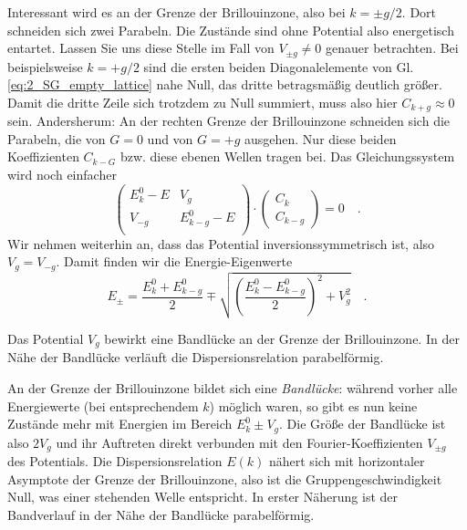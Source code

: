 Interessant wird es an der Grenze der Brillouinzone, also bei $k = \pm g/2$. Dort schneiden sich zwei Parabeln. Die Zustände sind ohne Potential also energetisch entartet. Lassen Sie uns diese Stelle im Fall von  $V_{\pm g} \neq 0$ genauer betrachten. Bei beispielsweise $k = + g/2$  sind die ersten beiden Diagonalelemente von Gl. \ref{eq:2_SG_empty_lattice} nahe Null, das dritte betragsmäßig deutlich größer. Damit die dritte Zeile sich trotzdem zu Null summiert, muss also hier $C_{k+g} \approx 0$ sein. Andersherum: An der rechten Grenze der Brillouinzone schneiden sich die Parabeln, die von $G =0$ und von $G=+g$ ausgehen. Nur diese beiden Koeffizienten $C_{k-G}$ bzw. diese ebenen Wellen tragen bei. Das Gleichungssystem wird noch einfacher 
\begin{equation}
    \begin{pmatrix}
        E_k^0 - E &  V_{g}  \\
     V_{-g}  &   E_{k - g}^0 - E   \\
 \end{pmatrix}
   \cdot
   \begin{pmatrix}
     C_{k} \\  C_{k - g} 
   \end{pmatrix}
  = 0 \quad . \label{eq:2_SG_empty_lattice_2}
 \end{equation}
Wir nehmen weiterhin an, dass das Potential inversionssymmetrisch ist, also $V_g = V_{-g}$. Damit finden wir die Energie-Eigenwerte
\begin{equation}
    E_\pm = \frac{ E_k^0 +   E_{k-g}^0}{2} \mp \sqrt{  \left( \frac{ E_k^0 -   E_{k-g}^0}{2} \right)^2 + V_g^2 }  \quad .
\end{equation}

\begin{marginfigure}
    \caption{Das Potential $V_g$ bewirkt eine Bandlücke an der Grenze der Brillouinzone. In der Nähe der Bandlücke verläuft die Dispersionsrelation parabelförmig.}
\end{marginfigure}

An der Grenze der Brillouinzone bildet sich eine \emph{Bandlücke}: während vorher alle Energiewerte (bei entsprechendem $k$) möglich waren, so gibt es nun keine Zustände mehr mit Energien  im Bereich $E_k^0   \pm  V_g$. Die Größe der Bandlücke ist also $2 V_g$ und ihr Auftreten direkt verbunden mit den Fourier-Koeffizienten $V_{\pm g}$ des Potentials.
Die Dispersionsrelation $E(k)$ nähert sich mit horizontaler Asymptote der Grenze der Brillouinzone, also ist die Gruppengeschwindigkeit Null, was einer stehenden Welle entspricht. In erster Näherung ist der Bandverlauf in der Nähe der Bandlücke parabelförmig. 

